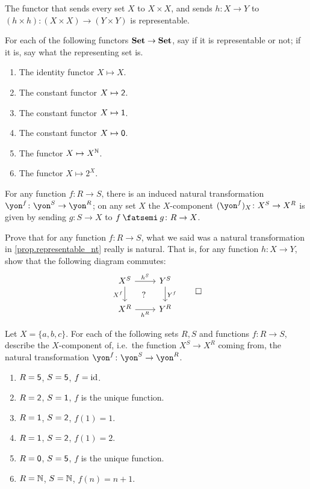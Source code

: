 \documentclass[DynamicalBook]{subfiles}
\begin{document}
\begin{example}
The functor that sends every set $X$ to $X\times X$, and sends $h\colon X\to Y$ to $(h\times h)\colon (X\times X)\to(Y\times Y)$ is representable. 
\end{example}

\begin{exercise}
For each of the following functors $\textbf{Set}\to\textbf{Set}$, say if it is representable or not; if it is, say what the representing set is.
\begin{enumerate}
	\item The identity functor $X\mapsto X$.
	\item The constant functor $X\mapsto\textsf{2}$.
	\item The constant functor $X\mapsto\textsf{1}$.
	\item The constant functor $X\mapsto\textsf{0}$.
	\item The functor $X\mapsto X^{\mathbb{N}}$.
	\item The functor $X\mapsto 2^X$.
\qedhere
\end{enumerate}
\end{exercise}

\begin{proposition}\label{prop.representable_nt}
For any function $f\colon R\to S$, there is an induced natural transformation $\yon^f\colon\yon^S\to \yon^R$; on any set $X$ the $X$-component $(\yon^f)_X\colon X^S\to X^R$ is given by sending $g\colon S\to X$ to $f\then g\colon R\to X$.
\end{proposition}

\begin{exercise}
Prove that for any function $f\colon R\to S$, what we said was a natural transformation in \cref{prop.representable_nt} really is natural. That is, for any function $h\colon X\to Y$, show that the following diagram commutes:
\[
\begin{tikzcd}
	X^S\ar[r, "h^S"]\ar[d, "X^f"']&
	Y^S\ar[d, "Y^f"]\\
	X^R\ar[r, "h^R"']&
	Y^R\ar[ul, phantom, "?"]
\end{tikzcd}
\qedhere
\]
\end{exercise}

\begin{exercise}
Let $X=\{a,b,c\}$. For each of the following sets $R,S$ and functions $f\colon R\to S$, describe the $X$-component of, i.e.\ the function $X^S\to X^R$ coming from, the natural transformation $\yon^f\colon\yon^S\to\yon^R$.
\begin{enumerate}
	\item $R=\textsf{5}$, $S=\textsf{5}$, $f=\mathrm{id}$.
	\item $R=\textsf{2}$, $S=\textsf{1}$, $f$ is the unique function.
	\item $R=\textsf{1}$, $S=\textsf{2}$, $f(1)=1$.
	\item $R=\textsf{1}$, $S=\textsf{2}$, $f(1)=2$.
	\item $R=\textsf{0}$, $S=\textsf{5}$, $f$ is the unique function.
	\item $R=\mathbb{N}$, $S=\mathbb{N}$, $f(n)=n+1$.
\qedhere
\end{enumerate}
\end{exercise}
\end{document}
